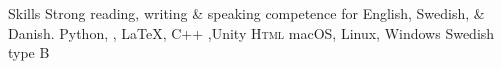 
\begin{rubric}{Skills}
\entry*[Languages]
	Strong reading, writing \& speaking competence for English, Swedish, \& Danish.
	Python, , \LaTeX, C++ ,Unity
\entry*[Databases]
	\textsc{Html}
\entry*[OS]
	macOS, Linux, Windows
	Swedish type B
\end{rubric}
